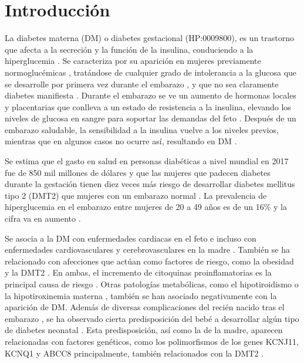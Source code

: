 \section{Introducción}

La diabetes materna (DM) o diabetes gestacional (HP:0009800), es un trastorno que afecta a la secreción y la función de la insulina, conduciendo a la hiperglucemia \cite{Rodolaki2023}. Se caracteriza por su aparición en mujeres previamente normoglucémicas \cite{Rodolaki2023}, tratándose de cualquier grado de intolerancia a la glucosa que se desarrolle por primera vez durante el embarazo \cite{ADB2009}, y que no sea claramente diabetes manifiesta \cite{Grazia2020}. Durante el embarazo se ve un aumento de hormonas locales y placentarias que conlleva a un estado de resistencia a la insulina, elevando los niveles de glucosa en sangre para soportar las demandas del feto \cite{Plows2018}. Después de un embarazo saludable, la sensibilidad a la insulina vuelve a los niveles previos, mientras que en algunos casos no ocurre así, resultando en DM \cite{Plows2018}.


Se estima que el gasto en salud en personas diabéticas a nivel mundial en 2017 fue de 850 mil millones de dólares \cite{Cho2018} y que las mujeres que padecen diabetes durante la gestación tienen diez veces más riesgo de desarrollar diabetes mellitus tipo 2 (DMT2) que mujeres con un embarazo normal \cite{Vounzoulaki2020} \cite{You2021}. La prevalencia de hiperglucemia en el embarazo entre mujeres de 20 a 49 años es de un 16\% y la cifra va en aumento \cite{Guariguata2014}.

Se asocia a la DM con enfermedades cardiacas en el feto \cite{Depla2021} e incluso con enfermedades cardiovasculares y cerebrovasculares en la madre \cite{Xie2022}. También se ha relacionado con afecciones que actúan como factores de riesgo, como la obesidad \cite{Shah2011} y la DMT2 \cite{Haroush2004}. En ambas, el incremento de citoquinas proinflamatorias es la principal causa de riesgo \cite{Pantham2015}. Otras patologías metabólicas, como el hipotiroidismo \cite{Gong2016} o la hipotiroxinemia materna \cite{Topaloglu2022}, también se han asociado negativamente con la aparición de DM.
Además de diversas complicaciones del recién nacido tras el embarazo \cite{Depla2021}\cite{Metzger2010}, se ha observado cierta predisposición del bebé a desarrollar algún tipo de diabetes neonatal \cite{Dabelea2000}. Esta predisposición, así como la de la madre, aparecen relacionadas con factores genéticos, como los polimorfismos de los genes KCNJ11, KCNQ1 \cite{Ao2015} y ABCC8 \cite{Piccini2018} principalmente, también relacionados con la DMT2 \cite{Khan2020}.


